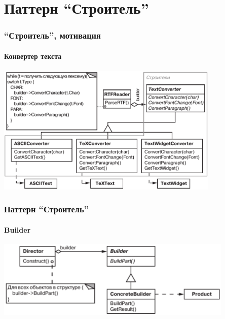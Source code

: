 \documentclass{../../slides-style}
\begin{document}
    \section{Паттерн ``Строитель''}

    \begin{frame}
        \frametitle{``Строитель'', мотивация}
        \framesubtitle{Конвертер текста}
        \begin{center}
            \includegraphics[width=0.8\textwidth]{textConverter.png}
        \end{center}
    \end{frame}

    \begin{frame}
        \frametitle{Паттерн ``Строитель''}
        \framesubtitle{Builder}
        \begin{center}
            \includegraphics[width=0.85\textwidth]{builder.png}
        \end{center}
    \end{frame}
    
\end{document}

